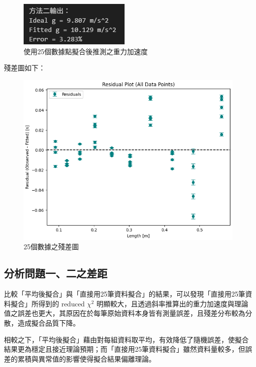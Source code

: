 \documentclass[12pt,a4paper]{article}
\begin{document}
\begin{CJK}{UTF8}{bkai}
\begin{figure}[h]
    \centering
    \includegraphics[width=0.45\linewidth]{Q2-4.png}
    \caption{使用25個數據點擬合後推測之重力加速度}
    \label{fig:Q2-4}
\end{figure}

殘差圖如下：

\begin{figure}[h]
    \centering
    \includegraphics[height=0.3\linewidth]{Q2-8.png}
    \caption{25個數據之殘差圖}
    \label{fig:Q2-8}
\end{figure}

\clearpage

\subsection{分析問題一、二之差距}
\hfill

比較「平均後擬合」與「直接用25筆資料擬合」的結果，可以發現「直接用25筆資料擬合」所得到的 reduced $\chi^2$ 明顯較大，且透過斜率推算出的重力加速度與理論值之誤差也更大，其原因在於每筆原始資料本身皆有測量誤差，且殘差分布較為分散，造成擬合品質下降。

相較之下，「平均後擬合」藉由對每組資料取平均，有效降低了隨機誤差，使擬合結果更為穩定且接近理論預期；而「直接用25筆資料擬合」雖然資料量較多，但誤差的累積與異常值的影響使得擬合結果偏離理論。








\end{CJK}
\end{document}

